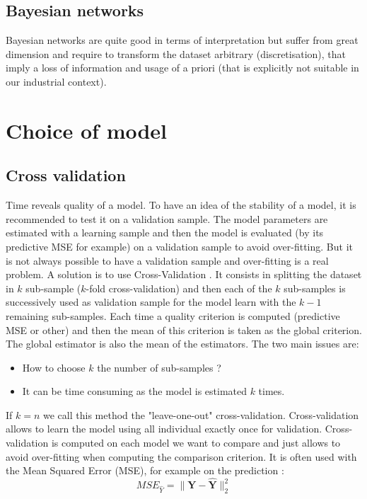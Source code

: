 \documentclass[12pt,a4paper]{report}
\begin{document}
	\subsection{Bayesian networks}
		\cite{heckerman1995learning,jensen2007bayesian,friedman2000using}
		Bayesian networks are quite good in terms of interpretation but suffer from great dimension and require to transform the dataset arbitrary (discretisation), that imply a loss of information and usage of a priori (that is explicitly not suitable in our industrial context). 
		
		
	

		\section{Choice of model}
			\subsection{Cross validation}
				
				Time reveals quality of a model. To have an idea of the stability of a model, it is recommended to test it on a validation sample. The model parameters are estimated with a learning sample and then the model is evaluated (by its predictive MSE for example) on a validation sample to avoid over-fitting. But it is not always possible to have a validation sample and over-fitting is a real problem. A solution is to use Cross-Validation \cite{kohavi1995study,arlot2010survey}. It consists in splitting the dataset in $k$ sub-sample ($k$-fold cross-validation) and then each of the $k$ sub-samples is successively used as validation sample for the model learn with the $k-1$ remaining sub-samples. Each time a quality criterion  is computed (predictive MSE or other) and then the mean of this criterion is taken as the global criterion. The global estimator is also the mean of the estimators. The two main issues are:
				\begin{itemize}
					\item How to choose $k$ the number of sub-samples ?
					\item It can be time consuming as the model is estimated $k$ times.
				\end{itemize}
				If $k=n$ we call this method the "leave-one-out" cross-validation.
				Cross-validation allows to learn the model using all individual exactly once for validation.
				Cross-validation is computed on each model we want to compare and just allows to avoid over-fitting when computing the comparison criterion.
				It is often used with the Mean Squared Error (MSE), for example on the prediction :
				\begin{equation}
					MSE_{\hat{Y}}=\parallel \boldsymbol{Y}-\hat{\boldsymbol{Y}} \parallel^2_2
				\end{equation}
\end{document}
